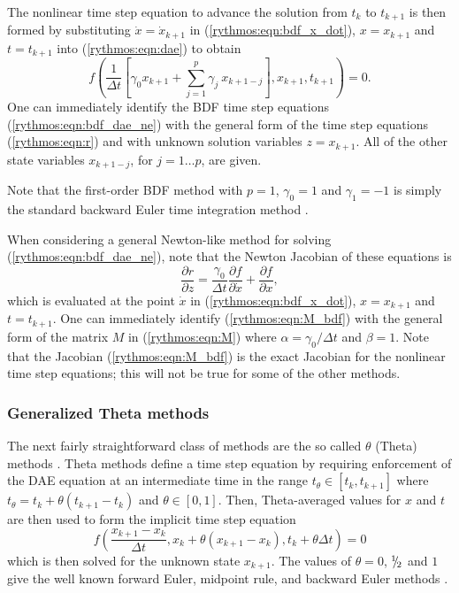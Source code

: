 \documentclass[pdf,ps2pdf,11pt]{SANDreport}
\begin{document}
The nonlinear time step equation to advance the solution from $t_k$ to
$t_{k+1}$ is then formed by substituting $\dot{x} = \dot{x}_{k+1}$ in
(\ref{rythmos:eqn:bdf_x_dot}), $x = x_{k+1}$ and $t = t_{k+1}$ into
(\ref{rythmos:eqn:dae}) to obtain
%
\begin{equation}
f\left( \frac{1}{\Delta t} \left[ \gamma_0 x_{k+1} + \sum_{j=1}^{p} \gamma_j \: x_{k+1-j} \right],x_{k+1},t_{k+1}\right) = 0.
\label{rythmos:eqn:bdf_dae_ne}
\end{equation}
%
One can immediately identify the BDF time step equations
(\ref{rythmos:eqn:bdf_dae_ne}) with the general form of the time step
equations (\ref{rythmos:eqn:r}) and with unknown solution variables $z =
x_{k+1}$.  All of the other state variables $x_{k+1-j}$, for $j = 1 {}\ldots
p$, are given.

Note that the first-order BDF method with $p=1$, $\gamma_0 = 1$ and $\gamma_1 =
-1$ is simply the standard backward Euler time integration method \cite{AscherPetzold}.

When considering a general Newton-like method for solving
(\ref{rythmos:eqn:bdf_dae_ne}), note that the Newton Jacobian of these
equations is
%
\begin{equation}
\frac{\partial r}{\partial z}
= \frac{\gamma_0}{\Delta t} \frac{\partial f}{\partial \dot{x}} + \frac{\partial f}{\partial x},
\label{rythmos:eqn:M_bdf}
\end{equation}
%
which is evaluated at the point $\dot{x}$ in (\ref{rythmos:eqn:bdf_x_dot}), $x
= x_{k+1}$ and $t = t_{k+1}$.  One can immediately identify
(\ref{rythmos:eqn:M_bdf}) with the general form of the matrix $M$ in
(\ref{rythmos:eqn:M}) where $\alpha = {}\gamma_0 / \Delta t$ and $\beta = 1$.
Note that the Jacobian (\ref{rythmos:eqn:M_bdf}) is the exact Jacobian for the
nonlinear time step equations; this will not be true for some of the other
methods.

\subsubsection{Generalized Theta methods}

The next fairly straightforward class of methods are the so called $\theta$
(Theta) methods \cite{HairerWanner}.  Theta methods define a time step equation by requiring
enforcement of the DAE equation at an intermediate time in the range
$t_{\theta} {}\in [t_k,t_{k+1}]$ where $t_{\theta} = t_k + \theta ( t_{k+1} -
t_k )$ and $\theta {}\in [0,1]$.  Then, Theta-averaged values for $x$ and $t$
are then used to form the implicit time step equation
%
\begin{equation}
f\left( \frac{x_{k+1} - x_{k}}{\Delta t},x_k + \theta ( x_{k+1} - x_{k} ), t_k + \theta \Delta t \right) = 0
\label{rythmos:eqn:theta_dae_ne}
\end{equation}
%
which is then solved for the unknown state $x_{k+1}$.  The values of $\theta =
0$, ${}^1 \!\! / \! {}_2$ and $1$ give the well known forward Euler, midpoint
rule, and backward Euler methods \cite{HairerWanner}.
\end{document}
